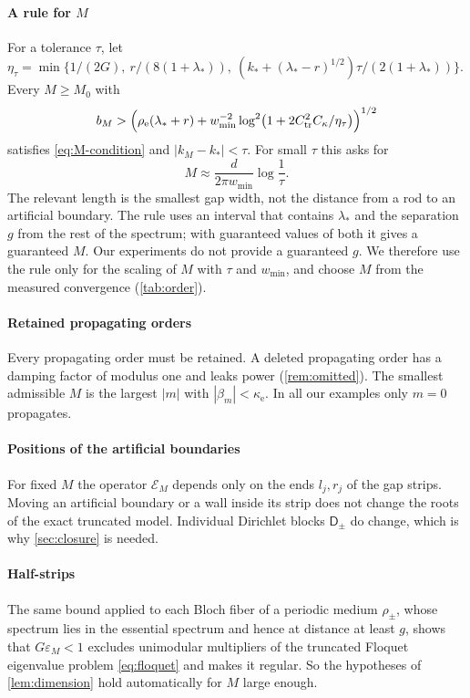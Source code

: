 \paragraph{A rule for $M$} For a tolerance $\tau$, let
$\eta_\tau=\min\{1/(2G),\ r/(8(1+\lambda_*)),\ (k_*+(\lambda_*-r)^{1/2})\tau/(2(1+\lambda_*))\}$.
Every $M\ge M_0$ with
\begin{equation}\label{eq:M-rule}
  b_M>\Bigl(\rho_{\mathrm e}(\lambda_*+r)+w_{\min}^{-2}
     \log^2\bigl(1+2C_{\mathrm{tr}}^2C_\kappa/\eta_\tau\bigr)\Bigr)^{1/2}
\end{equation}
satisfies \eqref{eq:M-condition} and $|k_M-k_*|<\tau$. For small $\tau$ this
asks for
\[
  M\approx\frac{d}{2\pi w_{\min}}\log\frac1\tau .
\]
The relevant length is the smallest gap width, not the distance from a rod
to an artificial boundary. The rule uses an interval that contains $\lambda_*$ and the
separation $g$ from the rest of the spectrum; with guaranteed values of both
it gives a guaranteed $M$. Our experiments do not provide a guaranteed $g$.
We therefore use the rule only for the scaling of $M$ with $\tau$ and
$w_{\min}$, and choose $M$ from the measured convergence (\cref{tab:order}).

\paragraph{Retained propagating orders} Every propagating order must be
retained. A deleted propagating order has a damping factor of modulus one
and leaks power (\cref{rem:omitted}). The smallest admissible $M$ is the
largest $|m|$ with $|\beta_m|<\kappa_{\mathrm e}$. In all our examples only
$m=0$ propagates.

\paragraph{Positions of the artificial boundaries} For fixed $M$ the operator
$\mathcal E_M$ depends only on the ends $l_j,r_j$ of the gap strips. Moving an
artificial boundary or a wall inside its strip does
not change the roots of the exact truncated model. Individual Dirichlet blocks
$\mathsf D_\pm$ do change, which is why \cref{sec:closure} is needed.

\paragraph{Half-strips} The same bound applied to each Bloch fiber of a
periodic medium $\rho_\pm$, whose
spectrum lies in the essential spectrum and hence at distance at least $g$,
shows that $G\varepsilon_M<1$ excludes unimodular multipliers of the truncated
Floquet eigenvalue problem \eqref{eq:floquet} and makes it regular. So the hypotheses of \cref{lem:dimension}
hold automatically for $M$ large enough.

